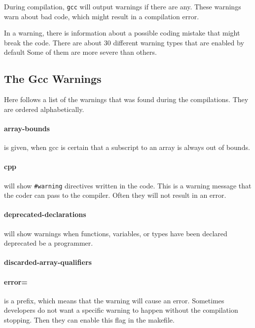 \documentclass[a4paper,11pt]{report}
\newcommand{\textcode}[1]{
    \fboxsep=1pt
    \texttt{\colorbox{gray!20}{#1}}
}
\newcommand{\figa}{
    \begin{figure}[!htpb]
    \centering
}
\newcommand{\figb}[2]{
    \caption{#1}
    \label{#2}
    \end{figure}
}
\begin{document}
During compilation, \texttt{gcc} will output warnings if there are any. These 
warnings warn about bad code, which might result in a compilation error.

In a warning, there is information about a possible coding mistake that might 
break the code. There are about 30 different warning types that are enabled by 
default \cite{gccwarnings} Some of them are more severe than others.
\\

        \subsection{The Gcc Warnings}
Here follows a list of the warnings that was found during the compilations. 
They are ordered alphabetically.


            \paragraph{array-bounds}
is given, when gcc is certain that a subscript to an array is always out of 
bounds.




            \paragraph{cpp}
will show \textcode{\#warning} directives written in the code. This is a warning 
message that the coder can pass to the compiler. Often they will not result in 
an error.


            \paragraph{deprecated-declarations}
will show warnings when functions, variables, or types have been declared 
deprecated be a programmer.


            \paragraph{discarded-array-qualifiers}
            \paragraph{error=}
is a prefix, which means that the warning will cause an error. Sometimes 
developers do not want a specific warning to happen without the compilation 
stopping. Then they can enable this flag in the makefile.
\end{document}

